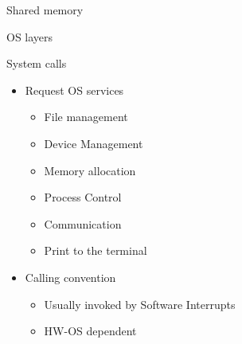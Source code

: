\documentclass{beamer}
\begin{document}
\begin{frame}{Shared memory}
  \begin{enumerate}
\end{enumerate}
\end{frame}

\begin{frame}{OS layers}
\end{frame}

\begin{frame}{System calls}
    \begin{itemize}
      \item Request OS services
    \begin{itemize}
      \item \alert<2>{File management}
      \item Device Management
      \item Memory allocation
      \item Process Control
      \item Communication
      \item Print to the terminal
   \end{itemize}
   \item Calling convention
    \begin{itemize}
    \item Usually invoked by Software Interrupts
    \item HW-OS dependent
   \end{itemize}
   \end{itemize}
\end{frame}
\end{document}
